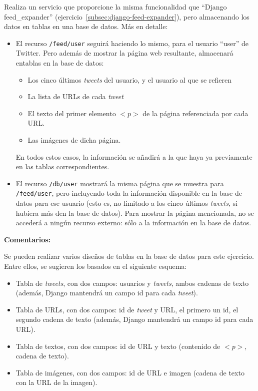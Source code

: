 Realiza un servicio que proporcione la misma funcionalidad que ``Django feed\_expander'' (ejercicio~\ref{subsec:django-feed-expander}), pero almacenando los datos en tablas en una base de datos. Más en detalle:

\begin{itemize}
\item El recurso \verb|/feed/user| seguirá haciendo lo mismo, para el usuario ``user'' de Twitter. Pero además de mostrar la página web resultante, almacenará entablas en la base de datos:

  \begin{itemize}
  \item Los cinco últimos \emph{tweets} del usuario, y el usuario al que se refieren
  \item La lista de URLs de cada \emph{tweet}
  \item El texto del primer elemento $<p>$ de la página referenciada por cada URL.
  \item Las imágenes de dicha página.
  \end{itemize}

En todos estos casos, la información se añadirá a la que haya ya previamente en las tablas correspondientes.

\item El recurso \verb|/db/user| mostrará la misma página que se muestra para \verb|/feed/user|, pero incluyendo toda la información disponible en la base de datos para ese usuario (esto es, no limitado a los cinco últimos \emph{tweets}, si hubiera más den la base de datos). Para mostrar la página mencionada, no se accederá a ningún recurso externo: sólo a la información en la base de datos.
\end{itemize}

\textbf{Comentarios:}

Se pueden realizar varios diseños de tablas en la base de datos para este ejercicio. Entre ellos, se sugieren los basados en el siguiente esquema:

\begin{itemize}
\item Tabla de \emph{tweets}, con dos campos: usuarios y \emph{tweets}, ambos cadenas de texto (además, Django mantendrá un campo id para cada \emph{tweet}).
\item Tabla de URLs, con dos campos: id de \emph{tweet} y URL, el primero un id, el segundo cadena de texto (además, Django mantendrá un campo id para cada URL).
\item Tabla de textos, con dos campos: id de URL y texto (contenido de $<p>$, cadena de texto).
\item Tabla de imágenes, con dos campos: id de URL e imagen (cadena de texto con la URL de la imagen).
\end{itemize}

